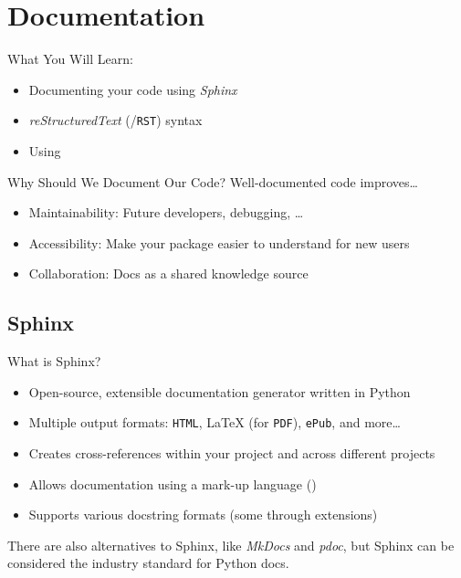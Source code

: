 \section{Documentation}


\begin{frame}[fragile]{What You Will Learn:}
  \begin{itemize}
    \item Documenting your code using \emph{Sphinx}
    \item \emph{reStructuredText} (\reST/\texttt{RST}) syntax
    \item Using \rtd
  \end{itemize}
\end{frame}


\begin{frame}[fragile]{Why Should We Document Our Code?}
  Well-documented code improves\dots
  \begin{itemize}
    \item Maintainability: Future developers, debugging, \dots
    \item Accessibility: Make your package easier to understand for new users
    \item Collaboration: Docs as a shared knowledge source
  \end{itemize}
\end{frame}

\subsection{Sphinx}
\begin{frame}[fragile]{
  What is Sphinx?
  \hfill
  }
  \begin{itemize}
    \setlength{\itemsep}{1em}
    \item Open-source, extensible documentation generator written in Python
    \item Multiple output formats: \texttt{HTML}, \LaTeX{} (for \texttt{PDF}), \texttt{ePub}, and more\dots
    \item Creates cross-references within your project and across different projects
    \item Allows documentation using a mark-up language (\reST)
    \item Supports various docstring formats (some through extensions)
  \end{itemize}

  \vspace{1cm}
  There are also alternatives to Sphinx, like \emph{MkDocs} and \emph{pdoc}, but Sphinx can be considered the industry standard for Python docs.
\end{frame}


